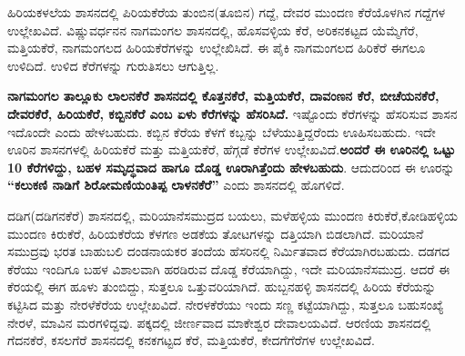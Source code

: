ಹಿರಿಯಕಳಲೆಯ ಶಾಸನದಲ್ಲಿ ಪಿರಿಯಕೆರೆಯ ತುಂಬಿನ(ತೂಬಿನ) ಗದ್ದೆ, ದೇವರ ಮುಂದಣ ಕೆರೆಯೊಳಗಿನ ಗದ್ದೆಗಳ ಉಲ್ಲೇಖವಿದೆ. ವಿಷ್ಣುವರ್ಧನನ ನಾಗಮಂಗಲ ಶಾಸನದಲ್ಲಿ, ಹೊಸವಳ್ಳಿಯ ಕೆರೆ, ಅರಿಕನಕಟ್ಟದ ಯೆಮ್ಮೆಗೆರೆ, ಮತ್ತಿಯಕೆರೆ, ನಾಗಮಂಗಲದ ಹಿರಿಯಕೆರೆಗಳನ್ನು ಉಲ್ಲೇಖಿಸಿದೆ. ಈ ಪೈಕಿ ನಾಗಮಂಗಲದ ಹಿರಿಕೆರೆ ಈಗಲೂ ಉಳಿದಿದೆ. ಉಳಿದ ಕೆರೆಗಳನ್ನು ಗುರುತಿಸಲು ಆಗುತ್ತಿಲ್ಲ.

\textbf{ನಾಗಮಂಗಲ ತಾಲ್ಲೂಕು ಲಾಲನಕೆರೆ ಶಾಸನದಲ್ಲಿ ಕೊತ್ತನಕೆರೆ, ಮತ್ತಿಯಕೆರೆ, ದಾವಂಣನ ಕೆರೆ, ಬೀಚೆಯನಕೆರೆ, ದೇವರಕೆರೆ, ಹಿರಿಯಕೆರೆ, ಕಬ್ಬಿನಕೆರೆ ಎಂಬ ಏಳು ಕೆರೆಗಳನ್ನು ಹೆಸರಿಸಿದೆ.} ಇಷ್ಟೊಂದು ಕೆರೆಗಳನ್ನು ಹೆಸರಿಸುವ ಶಾಸನ ಇದೊಂದೇ ಎಂದು ಹೇಳಬಹುದು. ಕಬ್ಬಿನ ಕೆರೆಯ ಕೆಳಗೆ ಕಬ್ಬನ್ನು ಬೆಳೆಯುತ್ತಿದ್ದರೆಂದು ಊಹಿಸಬಹುದು. ಇದೇ ಊರಿನ ಶಾಸನಗಳಲ್ಲಿ ಹಿರಿಯಕೆರೆ ಮತ್ತು ಮತ್ತಿಯಕೆರೆ, ಹೆಗ್ಗಡೆ ಕೆರೆಗಳ ಉಲ್ಲೇಖವಿದೆ.\textbf{ಅಂದರೆ ಈ ಊರಿನಲ್ಲಿ ಒಟ್ಟು 10 ಕೆರೆಗಳಿದ್ದು, ಬಹಳ ಸಮೃದ್ಧವಾದ ಹಾಗೂ ದೊಡ್ಡ ಊರಾಗಿತ್ತೆಂದು ಹೇಳಬಹುದು}. ಆದುದರಿಂದ ಈ ಊರನ್ನು \textbf{“ಕಲುಕಣಿ ನಾಡಿಗೆ ಶಿರೋಮಣಿಯಂತಿಪ್ಪ ಲಾಳನಕೆರೆ”} ಎಂದು ಶಾಸನದಲ್ಲಿ ಹೊಗಳಿದೆ.

ದಡಿಗ(ದಡಿಗನಕೆರೆ) ಶಾಸನದಲ್ಲಿ, ಮರಿಯಾನೆಸಮುದ್ರದ ಬಯಲು, ಮಳೆಹಳ್ಳಿಯ ಮುಂದಣ ಕಿರುಕೆರೆ,\break ಕೋಡಿಹಳ್ಳಿಯ ಮುಂದಣ ಕಿರುಕೆರೆ, ಹಿರಿಯಕೆರೆಯ ಕೆಳಗಣ ಅಡಕೆಯ ತೋಟಗಳನ್ನು ದತ್ತಿಯಾಗಿ ಬಿಡಲಾಗಿದೆ. ಮರಿಯಾನೆ ಸಮುದ್ರವು ಭರತ ಬಾಹುಬಲಿ ದಂಡನಾಯಕರ ತಂದೆಯ ಹೆಸರಿನಲ್ಲಿ ನಿರ್ಮಿತವಾದ ಕೆರೆಯಾಗಿರಬಹುದು. ದಡಗದ ಕೆರೆಯು ಇಂದಿಗೂ ಬಹಳ ವಿಶಾಲವಾಗಿ ಹರಡಿರುವ ದೊಡ್ಡ ಕೆರೆಯಾಗಿದ್ದು, ಇದೇ ಮರಿಯಾನೆಸಮುದ್ರ. ಆದರೆ ಈ ಕೆರಯಲ್ಲಿ ಈಗ ಹೂಳು ತುಂಬಿದ್ದು, ಸುತ್ತಲೂ ಒತ್ತುವರಿಯಾಗಿದೆ. ಹುಬ್ಬನಹಳ್ಳಿ ಶಾಸನದಲ್ಲಿ ಹಿರಿಯ ಕೆರೆಯನ್ನು ಕಟ್ಟಿಸಿದ ಮತ್ತು ನೇರಳೆಕೆರೆಯ ಉಲ್ಲೇಖವಿದೆ. ನೇರಳಕೆರೆಯು ಇಂದು ಸಣ್ಣ ಕಟ್ಟೆಯಾಗಿದ್ದು, ಸುತ್ತಲೂ ಬಹುಸಂಖ್ಯೆ ನೇರಳೆ, ಮಾವಿನ ಮರಗಳಿದ್ದವು. ಪಕ್ಕದಲ್ಲಿ ಜೀರ್ಣವಾದ ಮಾಕೇಶ್ವರ ದೇವಾಲಯವಿದೆ.  ಆರಣಿಯ ಶಾಸನದಲ್ಲಿ ಗೆದನಕೆರೆ, ಕಸಲಗೆರೆ ಶಾಸನದಲ್ಲಿ ಕನಕಗಟ್ಟದ ಕೆರೆ, ಮತ್ತಿಯಕೆರೆ, ಕೇದಗೆಗೆರೆಗಳ ಉಲ್ಲೇಖವಿದೆ.

